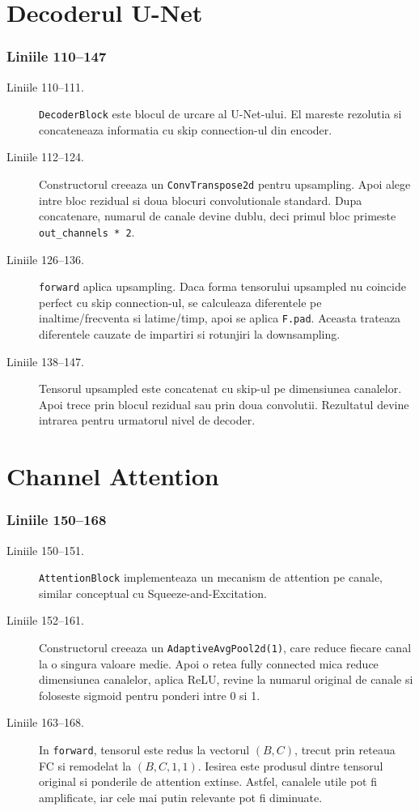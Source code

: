 \documentclass[12pt,a4paper]{report}
\newcommand{\codechunk}[2]{%
\subsection*{Liniile #1--#2}

}
\begin{document}
\chapter{Decoderul U-Net}

\codechunk{110}{147}

\begin{description}
    \item[Liniile 110--111.] \texttt{DecoderBlock} este blocul de urcare al U-Net-ului.
    El mareste rezolutia si concateneaza informatia cu skip connection-ul din encoder.

    \item[Liniile 112--124.] Constructorul creeaza un \texttt{ConvTranspose2d}
    pentru upsampling. Apoi alege intre bloc rezidual si doua blocuri convolutionale
    standard. Dupa concatenare, numarul de canale devine dublu, deci primul bloc
    primeste \texttt{out\_channels * 2}.

    \item[Liniile 126--136.] \texttt{forward} aplica upsampling. Daca forma tensorului
    upsampled nu coincide perfect cu skip connection-ul, se calculeaza diferentele
    pe inaltime/frecventa si latime/timp, apoi se aplica \texttt{F.pad}. Aceasta
    trateaza diferentele cauzate de impartiri si rotunjiri la downsampling.

    \item[Liniile 138--147.] Tensorul upsampled este concatenat cu skip-ul pe
    dimensiunea canalelor. Apoi trece prin blocul rezidual sau prin doua convolutii.
    Rezultatul devine intrarea pentru urmatorul nivel de decoder.
\end{description}

\chapter{Channel Attention}

\codechunk{150}{168}

\begin{description}
    \item[Liniile 150--151.] \texttt{AttentionBlock} implementeaza un mecanism de
    attention pe canale, similar conceptual cu Squeeze-and-Excitation.

    \item[Liniile 152--161.] Constructorul creeaza un \texttt{AdaptiveAvgPool2d(1)},
    care reduce fiecare canal la o singura valoare medie. Apoi o retea fully
    connected mica reduce dimensiunea canalelor, aplica ReLU, revine la numarul
    original de canale si foloseste sigmoid pentru ponderi intre 0 si 1.

    \item[Liniile 163--168.] In \texttt{forward}, tensorul este redus la vectorul
    \((B, C)\), trecut prin reteaua FC si remodelat la \((B,C,1,1)\). Iesirea
    este produsul dintre tensorul original si ponderile de attention extinse.
    Astfel, canalele utile pot fi amplificate, iar cele mai putin relevante pot
    fi diminuate.
\end{description}
\end{document}
